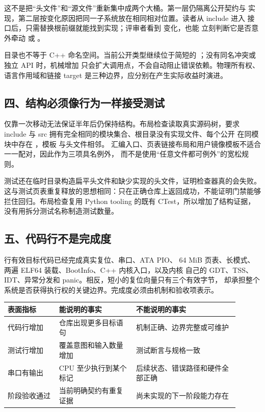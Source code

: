 这不是把“头文件”和“源文件”重新集中成两个大桶。第一层仍隔离公开契约与
实现，第二层按变化原因把同一子系统放在相同相对位置。读者从 include 进入
接口后，只需替换根前缀就能找到实现；评审者看到  变化，也能
立刻判断它是否意外牵动  或 。

目录也不等于 C++ 命名空间。当前公开类型继续位于简短的
；没有同名冲突或独立 API 时，机械增加
 只会扩大调用点，不会自动阻止错误依赖。物理所有权、
语言作用域和链接 target 是三种边界，应分别在产生实际收益时演进。

\subsection{四、结构必须像行为一样接受测试}

仅靠一次移动无法保证半年后仍保持结构。布局检查读取真实源码树，要求 include
与 src 拥有完全相同的模块集合、根目录没有实现文件、每个公开
 在同模块中存在 ，模板  与头文件相邻。
汇编入口、页表链接布局和用户镜像模板不适合一一配对，因此作为三项具名例外，
而不是使用“任意文件都可例外”的宽松规则。

测试还在临时目录构造扁平头文件和缺少实现的头文件，证明检查器真的会失败。
这与测试页表重复释放的思想相同：只在正确仓库上返回成功，不能证明门禁能够
拦住回归。布局检查复用 Python tooling 的既有 CTest，所以增加了结构证据，
没有用拆分测试名称制造测试数量。

\subsection{五、代码行不是完成度}

\OsProductionCodeLineCount 行有效目标代码已经完成真实复位、串口、ATA PIO、
64 MiB 页表、长模式、两遍 ELF64 装载、BootInfo、C++ 内核入口，以及内核
自己的 GDT、TSS、IDT、异常分发和 panic。相反，短小的复位向量只有三个有效字节，
却承担整个系统是否获得执行权的关键边界。完成度必须由机制和验收项表示。

\begin{longtable}{L{0.20\linewidth}L{0.30\linewidth}L{0.40\linewidth}}
\toprule
表面指标 & 能说明的事实 & 不能说明的事实 \\
\midrule
代码行增加 & 仓库出现更多目标语句 & 机制正确、边界完整或可维护 \\
测试行增加 & 覆盖意图和输入数量增加 & 测试断言与规格一致 \\
串口有输出 & CPU 至少执行到某个标记 & 后续状态、错误路径和硬件全部正确 \\
阶段验收通过 & 当前明确契约有重复证据 & 尚未实现的下一阶段能力存在 \\
\bottomrule
\end{longtable}

